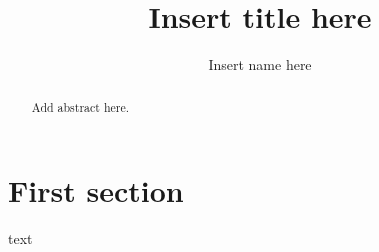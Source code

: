 \documentclass[]{article}			%
\title{Insert title here}
\author{Insert name here}
\begin{document}
\maketitle

\begin{abstract}
	
	Add abstract here.

\end{abstract}

\section{First section} 

text


\end{document}

